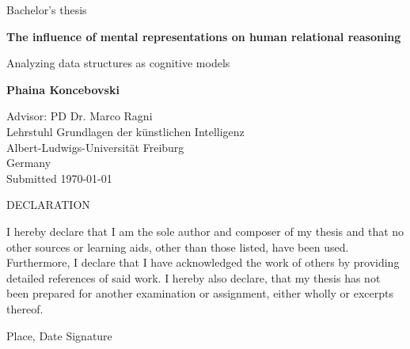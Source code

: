 \documentclass{article}
\begin{document}
\begin{titlepage}
	\begin{center}
	\Large Bachelor's thesis \par
	\vspace*{1cm}
	\Huge \textbf{The influence of mental representations on human relational reasoning} \par
	\vspace{0.5cm}
        \LARGE Analyzing data structures as cognitive models
    \vspace{1.5cm}
        
    \textbf{Phaina Koncebovski}
        
    \vfill
     
     \vspace{5cm}
        
     \Large
     Advisor: PD Dr. Marco Ragni\\
     Lehrstuhl Grundlagen der künstlichen Intelligenz\\
     Albert-Ludwigs-Universität Freiburg\\
     Germany\\
     Submitted \today
        
        
    \newpage
    \Large DECLARATION
    \end{center}

    I hereby declare that I am the sole author and composer of my thesis and that no other sources or 			learning aids, other than those listed, have been used. Furthermore, I declare that I have 					acknowledged the work of others by providing detailed references of said work.
	I hereby also declare, that my thesis has not been prepared for another examination
	or assignment, either wholly or excerpts thereof.    

	\vspace{5cm}    
    
    \noindent Place, Date \hspace{5cm} Signature
    
\end{titlepage}
\end{document}
